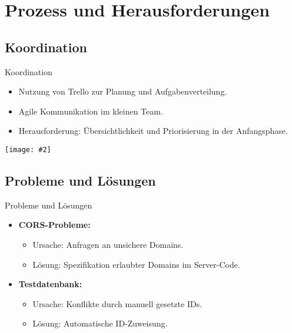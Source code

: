 \documentclass{beamer}
\newcommand{\centfig}[2]{\begin{center}
  \texttt{[image: \#2]}
  \end{center}}
\begin{document}
\section{Prozess und Herausforderungen}
\subsection{Koordination}
\begin{frame}{Koordination}
    \begin{itemize}
        \item Nutzung von Trello zur Planung und Aufgabenverteilung.
        \item Agile Kommunikation im kleinen Team.
        \item Herausforderung: Übersichtlichkeit und Priorisierung in der Anfangsphase.
    \end{itemize}
    \centfig{0.6}{trello.png}
\end{frame}

\subsection{Probleme und Lösungen}
\begin{frame}{Probleme und Lösungen}
    \begin{itemize}
        \item \textbf{CORS-Probleme:}
        \begin{itemize}
            \item Ursache: Anfragen an unsichere Domains.
            \item Lösung: Spezifikation erlaubter Domains im Server-Code.
        \end{itemize}
        \item \textbf{Testdatenbank:}
        \begin{itemize}
            \item Ursache: Konflikte durch manuell gesetzte IDs.
            \item Lösung: Automatische ID-Zuweisung.
        \end{itemize}
    \end{itemize}
\end{frame}

\end{document}
